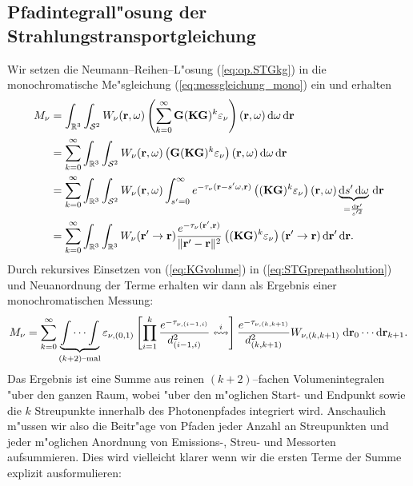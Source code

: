 	\subsection{Pfadintegrall"osung der Strahlungstransportgleichung}
	Wir setzen die Neumann--Reihen--L"osung (\ref{eq:op.STGkg}) in die monochromatische Me"sgleichung (\ref{eq:messgleichung_mono}) ein und erhalten
	\begin{align}
		M_\nu&=\int_{\mathbb{R}^3}\int_{\mathcal{S}^2}W_\nu(\mathbf{r},\omega) \left(\sum_{k=0}^\infty \mathbf{G} (\mathbf{KG})^k \varepsilon_\nu\right)(\mathbf{r},\omega) \,\text{d}\omega \,\text{d}\mathbf{r} \nonumber \\
		&=\sum_{k=0}^\infty \int_{\mathbb{R}^3}\int_{\mathcal{S}^2}W_\nu(\mathbf{r},\omega) \left(\mathbf{G} (\mathbf{KG})^k \varepsilon_\nu\right)(\mathbf{r},\omega) \,\text{d}\omega \,\text{d}\mathbf{r} \nonumber \\
		&=\sum_{k=0}^\infty \int_{\mathbb{R}^3}\int_{\mathcal{S}^2}W_\nu(\mathbf{r},\omega) \int_{s'=0}^\infty e^{-\tau_\nu(\mathbf{r}-s' \omega,\mathbf{r})} \left((\mathbf{KG})^k \varepsilon_\nu\right)(\mathbf{r},\omega) \underbrace{\text{d}s' \,\text{d}\omega}_{=\frac{\text{d}\mathbf{r}'}{s'^2}} \,\text{d}\mathbf{r} \nonumber \\
		&=\sum_{k=0}^\infty \int_{\mathbb{R}^3}\int_{\mathbb{R}^3}W_\nu(\mathbf{r}'\rightarrow\mathbf{r}) \frac{e^{-\tau_\nu(\mathbf{r}',\mathbf{r})}}{\|\mathbf{r}'-\mathbf{r}\|^2} \left((\mathbf{KG})^k \varepsilon_\nu\right)(\mathbf{r}'\rightarrow\mathbf{r}) \,\text{d}\mathbf{r}' \,\text{d}\mathbf{r}.
		\label{eq:STGprepathsolution}
	\end{align}
	Durch rekursives Einsetzen von (\ref{eq:KGvolume}) in (\ref{eq:STGprepathsolution}) und Neuanordnung der Terme erhalten wir dann als Ergebnis einer monochromatischen Messung:
	\begin{equation}
		M_\nu=\sum_{k=0}^\infty \underbrace{\idotsint}_{(k+2)\text{--mal}}\varepsilon_{\nu,(0,1)}\left[\prod_{i=1}^k\frac{e^{-\tau_{\nu,(i-1,i)}}}{d_{(i-1,i)}^2}\overset{i}{\leftrightsquigarrow}\right]\frac{e^{-\tau_{\nu,(k,k+1)}}}{d_{(k,k+1)}^2} W_{\nu,(k,k+1)} \;\text{d}\mathbf{r}_0 \dotsm \text{d}\mathbf{r}_{k+1} .
		\label{eq:STGpathsolution}
	\end{equation}
	Das Ergebnis ist eine Summe aus reinen $(k+2)$--fachen Volumenintegralen "uber den ganzen Raum, wobei "uber den m"oglichen Start- und Endpunkt sowie die $k$ Streupunkte innerhalb des Photonenpfades integriert wird.
	Anschaulich m"ussen wir also die Beitr"age von Pfaden jeder Anzahl an Streupunkten und jeder m"oglichen Anordnung von Emissions-, Streu- und Mess\-orten aufsummieren. Dies wird vielleicht klarer wenn wir die ersten Terme der Summe explizit ausformulieren:
